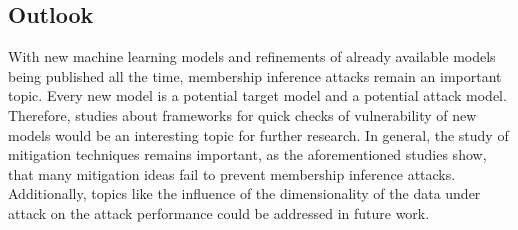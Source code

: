 \documentclass[runningheads]{llncs}
\begin{document}
\subsection{Outlook}

With new machine learning models and refinements of already available models being published all the time, membership inference attacks remain an important topic. Every new model is a potential target model and a potential attack model. Therefore, studies about frameworks for quick checks of vulnerability of new models would be an interesting topic for further research.
In general, the study of mitigation techniques remains important, as the aforementioned studies show, that many mitigation ideas fail to prevent membership inference attacks.
Additionally, topics like the influence of the dimensionality of the data under attack on the attack performance could be addressed in future work.


%
%
%
% 
% 
%

\printbibliography
\end{document}
